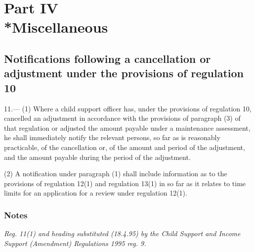 \documentclass[a4paper]{article}
\newcommand{\parthead}{}
\newcommand\amendment[1]{\subsubsection*{Notes}{\itshape\frenchspacing\footnotesize #1 \par}}
\begin{document}
\section[Part IV --- Miscellaneous]{Part IV\\*Miscellaneous}

\renewcommand\parthead{--- Part IV}

\subsection[11. Notifications following a cancellation or adjustment under the provisions of regulation 10]{Notifications following a cancellation or adjustment under the provisions of regulation 10}

11.—%
(1) Where a child support officer has, under the provisions of regulation 10, cancelled an adjustment in accordance with the provisions of paragraph (3) of that regulation or adjusted the amount payable under a maintenance assessment, he shall immediately notify the relevant persons, so far as is reasonably practicable, of the cancellation or, of the amount and period of the adjustment, and the amount payable during the period of the adjustment.

(2) A notification under paragraph (1) shall include information as to the provisions of regulation 12(1) and regulation 13(1) in so far as it relates to time limits for an application for a review under regulation 12(1).

\amendment{
Reg. 11(1) and heading substituted (18.4.95) by the Child Support and Income Support (Amendment) Regulations 1995 reg. 9.
}
\end{document}
